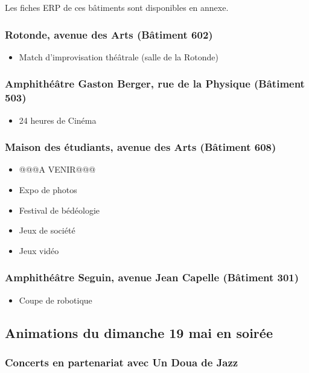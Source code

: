 \documentclass[hidelinks, paper=a4, fontsize=13pt]{report}
\begin{document}
Les fiches ERP de ces bâtiments sont disponibles en annexe.

\subsubsection{Rotonde, avenue des Arts (Bâtiment 602)}
\begin{itemize}
\item Match d’improvisation théâtrale (salle de la Rotonde)
\end{itemize}

\subsubsection{Amphithéâtre Gaston Berger, rue de la Physique (Bâtiment 503)}
\begin{itemize}
\item 24 heures de Cinéma
\end{itemize}

\subsubsection{Maison des étudiants, avenue des Arts (Bâtiment 608)}
\begin{itemize}
\item @@@A VENIR@@@
\item Expo de photos
\item Festival de bédéologie
\item Jeux de société
\item Jeux vidéo
\end{itemize}

\subsubsection{Amphithéâtre Seguin, avenue Jean Capelle (Bâtiment 301)}
\begin{itemize}
\item Coupe de robotique
\end{itemize}

\subsection{Animations du dimanche 19 mai en soirée}
\subsubsection{Concerts en partenariat avec Un Doua de Jazz}
\end{document}
